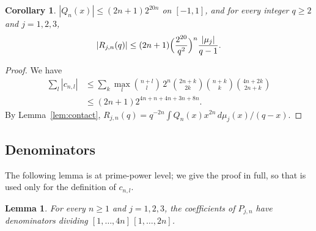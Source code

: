 \documentclass[11pt]{amsart}
\newtheorem{lemma}[proposition]{Lemma}
\newtheorem{pcorollary}[proposition]{Corollary}
\theoremstyle{definition}
\theoremstyle{remark}
\numberwithin{equation}{section}
\begin{document}
\begin{pcorollary}\label{cor:size}
$|Q_n(x)|\le(2n+1)2^{20n}$ on $[-1,1]$, and for every integer $q\ge2$ and $j=1,2,3$,
\[
|R_{j,n}(q)|\le(2n+1)\Bigl(\frac{2^{20}}{q^2}\Bigr)^n\frac{|\mu_j|}{q-1}.
\]
\end{pcorollary}

\begin{proof}
We have
\[
\begin{aligned}
\sum_l|c_{n,l}|&\le\sum_k\max_l\binom{n+l}l\,2^n\binom{2n+k}{2k}\binom{n+k}k\binom{4n+2k}{2n+k}\\
&\le(2n+1)2^{4n+n+4n+3n+8n}.
\end{aligned}
\]
By Lemma~\ref{lem:contact}, $R_{j,n}(q)=q^{-2n}\int Q_n(x)x^{2n}\,d\mu_j(x)/(q-x)$.
\end{proof}

\subsection{Denominators}
The following lemma is \cite[Lemma~9]{Lys18} at prime-power level; we give the proof in full, so that \cite{Lys18} is
used only for the definition of $c_{n,l}$.

\begin{lemma}\label{lem:den}
For every $n\ge1$ and $j=1,2,3$, the coefficients of $P_{j,n}$ have denominators dividing $[1,\dots,4n]\,[1,\dots,2n]$.
\end{lemma}
\end{document}
